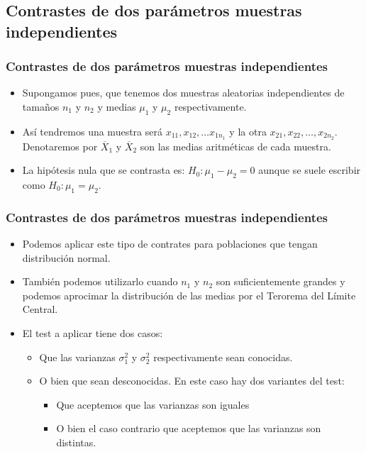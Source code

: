 \subsection{Contrastes de dos parámetros muestras independientes}
\begin{frame}
\frametitle{Contrastes de dos parámetros muestras independientes}
\begin{itemize}
\item Supongamos pues, que tenemos  dos muestras aleatorias independientes de tamaños $n_1$ y $n_2$ y medias $\mu_1$ y $\mu_2$  respectivamente.
\item Así tendremos una muestra será $x_{1 1}, x_{1 2},\ldots x_{1 n_1}$ y  la otra $x_{2 1}, x_{2 2},\ldots, x_{2 n_2}$.
Denotaremos por $\overline{X}_1$ y $\overline{X}_2$ son las medias aritméticas de cada muestra.
\item La hipótesis  nula que se contrasta es: $H_0: \mu_1-\mu_2=0$ aunque se suele escribir como $H_0: \mu_1=\mu_2$. 
\end{itemize}
\end{frame}

\begin{frame}
\frametitle{Contrastes de dos parámetros muestras independientes}
\begin{itemize}
\item Podemos aplicar este tipo de contrates para poblaciones que tengan distribución normal.
\item También podemos utilizarlo  cuando  $n_1$ y $n_2$ son suficientemente grandes y podemos aprocimar la distribución de las medias por el Terorema del Límite Central.
\item El test a aplicar tiene dos casos:
\begin{itemize}
\item Que  las varianzas $\sigma^2_1$ y $\sigma^2_2$ respectivamente sean  conocidas. 
\item O bien que sean desconocidas. En este caso hay dos variantes del test:
\begin{itemize}
\item Que aceptemos que las varianzas son iguales
\item O bien el caso contrario que aceptemos que  las varianzas son  distintas.
\end{itemize}
\end{itemize}
\end{itemize}
\end{frame}


